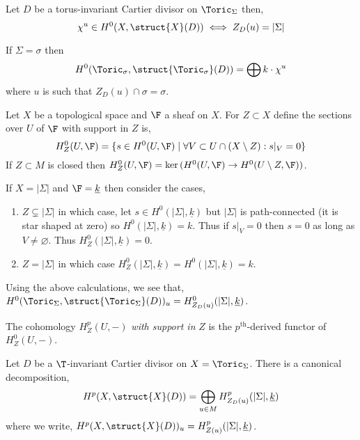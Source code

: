 \begin{corollary}
Let $D$ be a torus-invariant Cartier divisor on $\Toric_\Sigma$ then,
\[ \chi^u \in H^0(X, \struct{X}(D)) \iff Z_D(u) = |\Sigma| \]
\end{corollary}

\begin{example}
If $\Sigma = \sigma$ then
\[ H^0(\Toric_\sigma, \struct{\Toric_\sigma}(D)) = \bigoplus k \cdot \chi^u \]
where $u$ is such that $Z_D(u) \cap \sigma = \sigma$. 
\end{example}

\begin{definition}
Let $X$ be a topological space and $\F$ a sheaf on $X$. For $Z \subset X$ define the sections over $U$ of $\F$ with support in $Z$ is,
\[ H^0_Z(U, \F) = \{ s \in H^0(U, \F) \mid \forall V \subset U \cap (X \setminus Z) : s|_V = 0 \} \]
If $Z \subset M$ is closed then $H^0_Z(U, \F) = \ker{(H^0(U, \F) \to H^0(U \setminus Z, \F))}$. 
\end{definition}

\begin{example}
If $X = |\Sigma|$ and $\F = \underline{k}$ then consider the cases,
\begin{enumerate}
\item $Z \subsetneq |\Sigma|$ in which case, let $s \in H^0(|\Sigma|, \underline{k})$ but $|\Sigma|$ is path-connected (it is star shaped at zero) so $H^0(|\Sigma|, \underline{k}) = k$. Thus if $s|_V = 0$ then $s = 0$ as long as $V \neq \varnothing$. Thus $H_Z^0(|\Sigma|, \underline{k}) = 0$.
\item $Z = |\Sigma|$ in which case $H_Z^0(|\Sigma|, \underline{k}) = H^0(|\Sigma|, \underline{k}) = k$. 
\end{enumerate}
\end{example}

\begin{proposition}
Using the above calculations, we see that,
$H^0(\Toric_\Sigma, \struct{\Toric_\Sigma}(D))_u = H^0_{Z_D(u)}(|\Sigma|, \underline{k})$.
\end{proposition}

\begin{definition}
The cohomology $H_Z^p(U, -)$ \textit{with support in} $Z$ is the $p^{\text{th}}$-derived functor of $H^0_Z(U, -)$.
\end{definition}

\begin{theorem}
Let $D$ be a $\T$-invariant Cartier divisor on $X = \Toric_\Sigma$. There is a canonical decomposition,
\[ H^p(X, \struct{X}(D)) = \bigoplus_{u \in M} H^p_{Z_D(u)}(|\Sigma|, \underline{k}) \]
where we write, $H^p(X, \struct{X}(D))_u = H^p_{Z(u)}(|\Sigma|, \underline{k})$.
\end{theorem}

